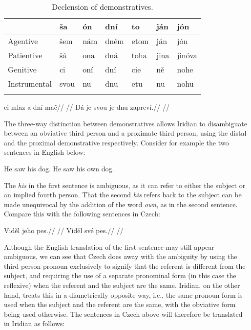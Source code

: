 \begin{table}
    \footnotesize\sffamily
        \caption{Declension of demonstratives.}
        \medskip
        \begin{tabu}to 
            \toprule
                            & {ša}	& {ón}	&{dní}& {to}	& {ján}	&{jón}\\
            \midrule \addlinespace
            Agentive&šem&nám&dněm&etom&ján&jón\\\addlinespace
            Patientive&šá&ona&dná&toha&jina&jinóva\\\addlinespace
            Genitive&ci&oní&dní&cie&ně&nohe\\\addlinespace
            Instrumental&svou&nu&dnu&etu&nu&nohu\\\addlinespace
            \bottomrule
            \label{dem-conj}
        \end{tabu}
    \end{table}

\pex
\a{}
\begingl
\gla ci mlaz a dní mač//
\glft {}//
\endgl
\a{}
\begingl
\gla Dá je svou je dnu zapreví.//
\glft {}//
\endgl
\xe

The three-way distinction between demonstratives allows Iridian to disambiguate between an obviative third person and a proximate third person, using the distal and the proximal demonstrative respectively. Consider for example the two sentences in English below:

\pex
\a He saw his dog.
\a He saw his own dog.\smallskip
\xe

The \emph{his} in the first sentence is ambiguous, as it can refer to either the subject or an implied fourth person. That the second \emph{his} refers back to the subject can be made unequivocal by the addition of the word \emph{own}, as in the second sentence. Compare this with the following sentences in Czech:

\begin{multicols}{2}
  \pex
  \a
  \begingl
  \gla Viděl jeho pes.//
  \glft {}//
  \endgl
  \a \begingl
  \gla Viděl své pes.//
  \glft {}//
  \endgl
  \xe
\end{multicols}

Although the English translation of the first sentence may still appear ambiguous, we can see that Czech does away with the ambiguity by using the third person pronoun  exclusively to signify that the referent is different from the subject, and requiring the use of a separate pronominal form (in this case the reflexive) when the referent and the subject are the same. Iridian, on the other hand, treats this in a diametrically opposite way, i.e., the same pronoun form is used when the subject and the referent are the same, with the obviative form being used otherwise. The sentences in Czech above will therefore be translated in Iridian as follows:


